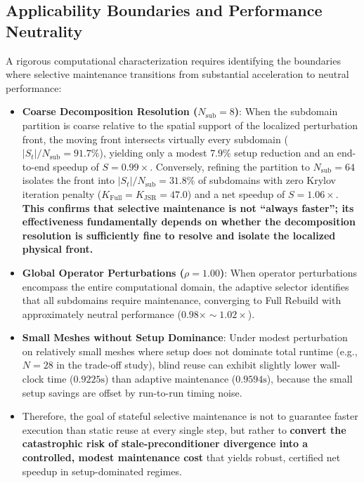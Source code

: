 \documentclass[preprint,12pt,3p]{elsarticle}
\begin{document}
\subsection{Applicability Boundaries and Performance Neutrality}
\label{subsec:boundaries}
A rigorous computational characterization requires identifying the boundaries where selective maintenance transitions from substantial acceleration to neutral performance:
\begin{itemize}
    \item \textbf{Coarse Decomposition Resolution ($N_{\text{sub}} = 8$)}: When the subdomain partition is coarse relative to the spatial support of the localized perturbation front, the moving front intersects virtually every subdomain ($|S_t| / N_{\text{sub}} = 91.7\%$), yielding only a modest $7.9\%$ setup reduction and an end-to-end speedup of $S = 0.99\times$. Conversely, refining the partition to $N_{\text{sub}} = 64$ isolates the front into $|S_t| / N_{\text{sub}} = 31.8\%$ of subdomains with zero Krylov iteration penalty ($K_{\text{Full}} = K_{\text{JSR}} = 47.0$) and a net speedup of $S = 1.06\times$. \textbf{This confirms that selective maintenance is not ``always faster''; its effectiveness fundamentally depends on whether the decomposition resolution is sufficiently fine to resolve and isolate the localized physical front.}
    \item \textbf{Global Operator Perturbations ($\rho = 1.00$)}: When operator perturbations encompass the entire computational domain, the adaptive selector identifies that all subdomains require maintenance, converging to Full Rebuild with approximately neutral performance ($0.98\times \sim 1.02\times$).
    \item \textbf{Small Meshes without Setup Dominance}: Under modest perturbation on relatively small meshes where setup does not dominate total runtime (e.g., $N=28$ in the trade-off study), blind reuse can exhibit slightly lower wall-clock time ($0.9225\text{s}$) than adaptive maintenance ($0.9594\text{s}$), because the small setup savings are offset by run-to-run timing noise.
    \item Therefore, the goal of stateful selective maintenance is not to guarantee faster execution than static reuse at every single step, but rather to \textbf{convert the catastrophic risk of stale-preconditioner divergence into a controlled, modest maintenance cost} that yields robust, certified net speedup in setup-dominated regimes.
\end{itemize}
\end{document}
